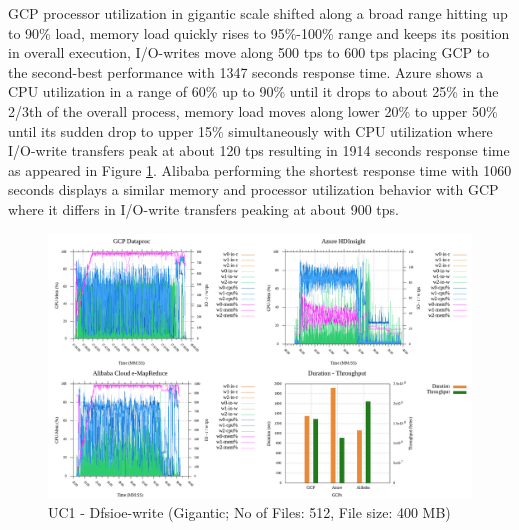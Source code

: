 \documentclass[review]{elsarticle}
\begin{document}
GCP processor utilization in gigantic scale shifted along a broad range hitting up to 90\% load, memory load quickly rises to 95\%-100\% range and keeps its position in overall execution, I/O-writes move along 500 tps to 600 tps placing GCP to the second-best performance with 1347 seconds response time. Azure shows a CPU utilization in a range of 60\% up to 90\% until it drops to about 25\% in the 2/3th of the overall process, memory load moves along lower 20\% to upper 50\% until its sudden drop to upper 15\% simultaneously with CPU utilization where I/O-write transfers peak at about 120 tps resulting in 1914 seconds response time as appeared in Figure \ref{fig:uc1-dfsioew-g-cmidt}. Alibaba performing the shortest response time with 1060 seconds displays a similar memory and processor utilization behavior with GCP where it differs in I/O-write transfers peaking at about 900 tps.

\begin{figure}[p]
	\caption{UC1 - Dfsioe-write (Gigantic; No of Files: 512, File size: 400 MB)}
	\label{fig:uc1-dfsioew-g-cmidt}
	\includegraphics[width=\textwidth]{uc1-dfsioew-g-cmidt}
	\centering
\end{figure}

\end{document}
